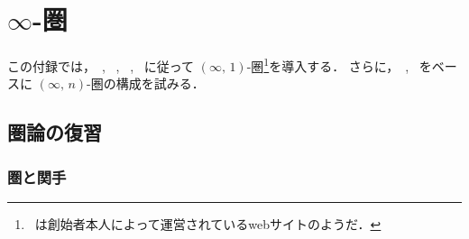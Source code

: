 \documentclass[TQFT_main]{subfiles}
\begin{document}
\chapter{$\infty$-圏}

この付録では，~\cite{lurie2008higher}, ~\cite{kerodon}, ~\cite{Land2021infinity}, ~\cite{alfonsi2023higher}に従って $(\infty,\, 1)$-圏\footnote{~\cite{kerodon}は創始者本人によって運営されているwebサイトのようだ．}を導入する．
さらに，~\cite{barwick2020unicityhomotopytheoryhigher}, ~\cite{ayala2020factorizationhomologyihigher}をベースに $(\infty,\, n)$-圏の構成を試みる．

\section{圏論の復習}

\subsection{圏と関手}
\end{document}
